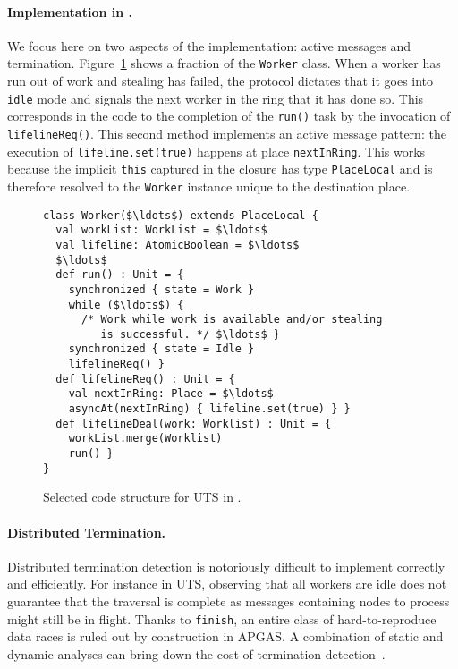 \paragraph{Implementation in \apgas.} We focus here on two aspects of the
implementation: active messages and termination. Figure~\ref{fig:utsapgas}
shows a fraction of the \lstinline{Worker} class.
When a worker has run out of work and stealing has failed, the protocol
dictates that it goes into \lstinline{idle} mode and signals the next worker in
the ring that it has done so. This corresponds in the code to the completion of
the \lstinline{run()} task by the invocation of \lstinline{lifelineReq()}. This
second method implements an active message pattern: the execution of
\lstinline{lifeline.set(true)} happens at place \lstinline{nextInRing}. This
works because the implicit \lstinline{this} captured in the closure has type
\lstinline{PlaceLocal} and is therefore resolved to the \lstinline{Worker}
instance unique to the destination place.

\begin{figure}
\begin{lstlisting}
class Worker($\ldots$) extends PlaceLocal {
  val workList: WorkList = $\ldots$
  val lifeline: AtomicBoolean = $\ldots$
  $\ldots$
  def run() : Unit = {
    synchronized { state = Work }
    while ($\ldots$) {
      /* Work while work is available and/or stealing
         is successful. */ $\ldots$ }
    synchronized { state = Idle }
    lifelineReq() }
  def lifelineReq() : Unit = {
    val nextInRing: Place = $\ldots$
    asyncAt(nextInRing) { lifeline.set(true) } }
  def lifelineDeal(work: Worklist) : Unit = {
    workList.merge(Worklist)
    run() }
}
\end{lstlisting}
\caption{Selected code structure for UTS in \apgas.\label{fig:utsapgas}}
\end{figure}

\paragraph{Distributed Termination.} Distributed termination detection is
notoriously difficult to implement correctly and efficiently.  For instance in
UTS, observing that all workers are idle does not guarantee that the traversal
is complete as messages containing nodes to process might still be in flight.
Thanks to \lstinline{finish}, an entire class of hard-to-reproduce data races
is ruled out by construction in APGAS.  A combination of static and dynamic
analyses can bring down the cost of termination
detection~\cite{TardieuETAL14X10ApgasAtPetascale}. 

